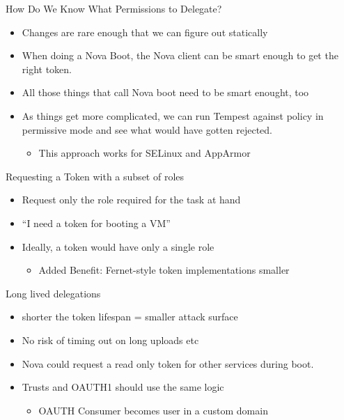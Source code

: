\documentclass{beamer}
\begin{document}
\begin{frame}{How Do We Know What Permissions to Delegate?}
  \begin{itemize}
  \item Changes are rare enough that we can figure out statically
  \item When doing a Nova Boot, the Nova client can be smart enough to get the right token.
  \item All those things that call Nova boot need to be smart enought, too
  \item As things get more complicated, we can run Tempest against policy in permissive mode and see what would have gotten rejected.
    \begin{itemize}
    \item This approach works for SELinux and AppArmor
    \end{itemize}
  \end{itemize}
\end{frame}

\begin{frame}{Requesting a Token with a subset 	of roles}
  \begin{itemize}
  \item Request only the role required for the task at hand
  \item ``I need a token for booting a VM''
  \item Ideally, a token would have only a single role
    \begin{itemize}
    \item Added Benefit: Fernet-style token implementations smaller
    \end{itemize}
  \end{itemize}
\end{frame}


\begin{frame}{Long lived delegations}
  \begin{itemize}
  \item shorter the token lifespan  = smaller attack surface
  \item No risk of timing out on long uploads etc
  \item Nova could request a read only token for other services during boot.
  \item Trusts and OAUTH1 should use the same logic
    \begin{itemize}
    \item OAUTH Consumer becomes user in a custom domain
    \end{itemize}
  \end{itemize}
\end{frame}
\end{document}
